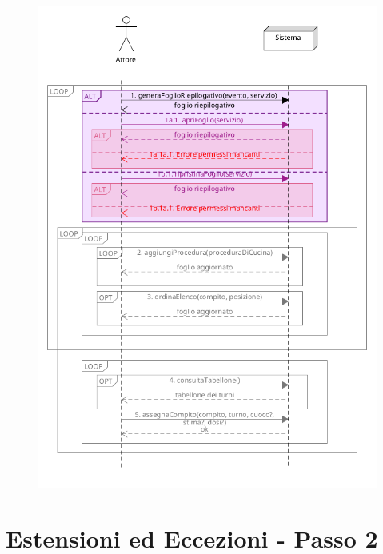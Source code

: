 \begin{figure}[h]
    \begin{center}
      \includegraphics[scale = 0.5]{images/SSD/SSD - Passo 1.png}
    \end{center}
\end{figure}
\pagebreak
\section{Estensioni ed Eccezioni - Passo 2}

